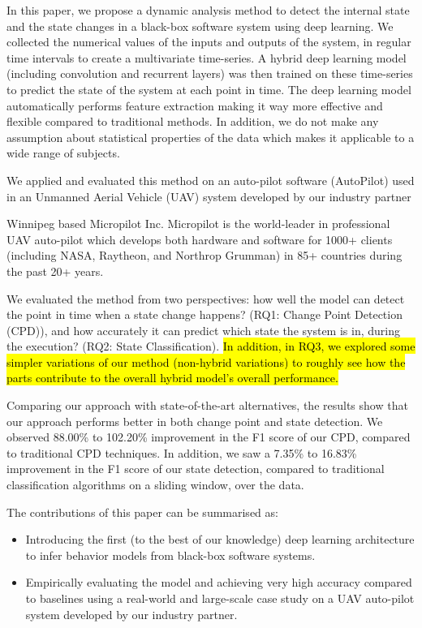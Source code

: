 In this paper, we propose a dynamic analysis method to detect the internal state and the state changes in a black-box software system using deep learning. We collected the numerical values of the inputs and outputs of the system, in regular time intervals to create a multivariate time-series. A hybrid deep learning model (including convolution and recurrent layers) was then trained on these time-series to predict the state of the system at each point in time. The deep learning model automatically performs feature extraction making it way more effective and flexible compared to traditional methods. In addition, we do not make any assumption about statistical properties of the data which makes it applicable to a wide range of subjects.   

We applied and evaluated this method on an auto-pilot software (AutoPilot) used in an Unmanned Aerial Vehicle (UAV) system developed by our industry partner
\begin{anonsuppress}
Winnipeg based Micropilot Inc. Micropilot is the world-leader in professional UAV auto-pilot which develops both hardware and software for 1000+ clients (including NASA, Raytheon, and Northrop Grumman) in 85+ countries during the past 20+ years. 
\end{anonsuppress}
We evaluated the method from two perspectives: how well the model can detect the point in time when a state change happens? (RQ1: Change Point Detection (CPD)), and how accurately it can predict which state the system is in, during the execution? (RQ2: State Classification). \hl{In addition, in RQ3, we explored some simpler variations of our method (non-hybrid variations) to roughly see how the parts contribute to the overall hybrid model's overall performance.}



Comparing our approach with state-of-the-art alternatives, the results show that our approach performs better in both change point and state detection. We observed 88.00\% to 102.20\% improvement in the F1 score of our CPD, compared to traditional CPD techniques. In addition, we saw a 7.35\% to 16.83\% improvement in the F1 score of our state detection, compared to traditional classification algorithms on a sliding window, over the data.


The contributions of this paper can be summarised as:
\begin{itemize}
    \item Introducing the first (to the best of our knowledge) deep learning architecture to infer behavior models from black-box software systems.
    \item Empirically evaluating the model and achieving very high accuracy compared to baselines using a real-world and large-scale case study on a UAV auto-pilot system developed by our industry partner.
\end{itemize}


